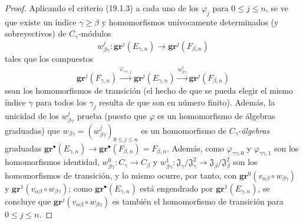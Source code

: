 \begin{proof}
Aplicando el criterio (19.1.3) a cada uno de los $\varphi_j$ para $0\leq j\leq n$,
se ve que existe un índice $\gamma\geq\beta$ y homomorfismos
unívocamente determinados (y sobreyectivos) de $C_\gamma$-módulos
\[
  w_{\beta\gamma}^j:\mathbf{gr}^j(E_{\gamma,n})\longrightarrow
  \mathbf{gr}^j(F_{\beta,n})
\]
tales que los compuestos
\[
  \mathbf{gr}^j(F_{\gamma,n})
  \xrightarrow{\varphi_{\gamma\gamma,j}}\mathbf{gr}^j(E_{\gamma,n})
  \xrightarrow{w_{\beta\gamma}^j}\mathbf{gr}^j(F_{\beta,n})
\]
sean los homomorfismos de transición (el hecho de que se pueda elegir el mismo
índice $\gamma$ para todos los $\gamma_j$ resulta de que son en número
finito). Además, la unicidad de los $w_{\beta\gamma}^j$ prueba (puesto que $\varphi$ es
un homomorfismo de álgebras graduadas) que
$w_{\beta\gamma}=(w_{\beta\gamma}^j)_{0\leq j\leq n}$ es un homomorfismo de
$C_\gamma$-\emph{álgebras} graduadas
$\mathbf{gr}^\bullet(E_{\gamma,n})\to\mathbf{gr}^\bullet(F_{\beta,n})=F_{\beta,n}$.
Además, como $\varphi_{\gamma\gamma,0}$ y $\varphi_{\gamma\gamma,1}$ son
los homomorfismos identidad,
$w_{\beta\gamma}^0:C_\gamma\to C_\beta$ y
$w_{\beta\gamma}^1:\mathfrak J_\gamma/\mathfrak J_\gamma^2
\to\mathfrak J_\beta/\mathfrak J_\beta^2$ son los homomorfismos de
transición, y lo mismo ocurre, por tanto, con
$\mathbf{gr}^0(v_{\alpha\beta}\circ w_{\beta\gamma})$ y
$\mathbf{gr}^1(v_{\alpha\beta}\circ w_{\beta\gamma})$; como
$\mathbf{gr}^\bullet(E_{\gamma,n})$ está engendrado por $\mathbf{gr}^1(E_{\gamma,n})$, se concluye que
$\mathbf{gr}^j(v_{\alpha\beta}\circ w_{\beta\gamma})$ es también el homomorfismo de
transición para $0\leq j\leq n$.


\end{proof}
